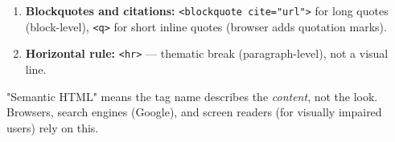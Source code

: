 \documentclass[11pt]{article}
\begin{document}
\begin{methode}
\begin{enumerate}
\begin{itemize}
            \item \texttt{<header>} — Introductory content (logo, nav, hero).
            \item \texttt{<nav>} — Primary navigation links.
            \item \texttt{<main>} — Dominant content of the \texttt{<body>} (unique per page).
            \item \texttt{<section>} — Thematic grouping \emph{with a heading}.
            \item \texttt{<article>} — Self-contained composition (blog post, news item, product card).
            \item \texttt{<aside>} — Tangentially related content (sidebar, pull quote, ads).
            \item \texttt{<footer>} — Footer for nearest sectioning root (author, copyright, related links).
            \item \texttt{<div>} — Generic container \emph{only} when no semantic tag fits (styling hook).
        \end{itemize}
    \item \textbf{Blockquotes and citations:} \texttt{<blockquote cite="url">} for long quotes (block-level), \texttt{<q>} for short inline quotes (browser adds quotation marks).
    \item \textbf{Horizontal rule:} \texttt{<hr>} — thematic break (paragraph-level), not a visual line.
\end{enumerate}
\begin{aretenir}
"Semantic HTML" means the tag name describes the \emph{content}, not the look. Browsers, search engines (Google), and screen readers (for visually impaired users) rely on this.
\end{aretenir}
\end{methode}
\end{document}
